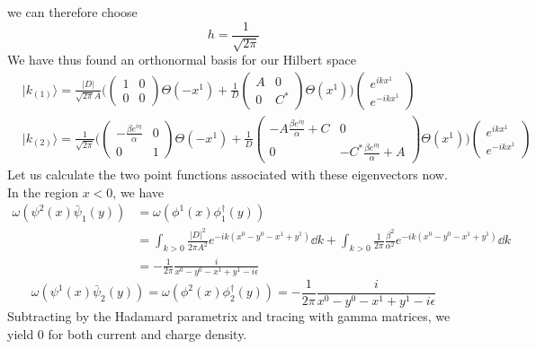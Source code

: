we can therefore choose
\begin{equation*}
h = \frac{1}{\sqrt{2\pi}}
\end{equation*}
We have thus found an orthonormal basis for our Hilbert space
\begin{equation}
\begin{split}
& | k_{(1)} \rangle = \frac{|D|}{\sqrt{2\pi}A}\bigg( \begin{pmatrix} 1 & 0 \\ 0 & 0 \end{pmatrix}
\Theta(-x^1) + 
\frac{1}{D}\begin{pmatrix} A & 0 \\  0 & C^* \end{pmatrix} \Theta(x^1) \bigg)
\begin{pmatrix} e^{ikx^1}  \\ e^{-ikx^1} \end{pmatrix}   \\
& | k_{(2)} \rangle = \frac{1}{\sqrt{2\pi}}
\Bigg( \begin{pmatrix} -\frac{\beta e^{i\eta}}{\alpha} & 0 \\ 0 & 1 \end{pmatrix}
\Theta(-x^1) + 
\frac{1}{D}\begin{pmatrix} -A\frac{\beta e^{i\eta}}{\alpha} + C  & 0\\ 0&  -C^*\frac{\beta e^{i\eta}}{\alpha} + A  \end{pmatrix} \Theta(x^1) \Bigg)
\begin{pmatrix} e^{ikx^1}  \\  e^{-ikx^1}  \end{pmatrix}  
\end{split}
\end{equation}
Let us calculate the two point functions associated with these eigenvectors now. In the region $x<0$, we have
\begin{equation*}
\begin{split}
\omega(\psi^2(x)\bar{\psi}_1(y)) & =  \omega(\phi^1(x)\phi^\dagger_1(y)) \\
& = \int_{k > 0} \frac{|D|^2}{2\pi A^2} e^{-ik(x^0 - y^0 - x^1 + y^1)} \dd k + \int_{k>0} \frac{1}{2\pi}  \frac{\beta^2}{\alpha^2} e^{-ik(x^0 - y^0 - x^1 + y^1)} \dd k\\
& = -\frac{1}{2\pi}\frac{i}{x^0 - y^0 - x^1 + y^1 - i\epsilon} 
\end{split}
\end{equation*}
\begin{equation*}
\omega(\psi^1(x)\bar{\psi}_2(y))   =  \omega(\phi^2(x)\phi^\dagger_2(y)) = -\frac{1}{2\pi}\frac{i}{x^0 - y^0 - x^1 + y^1 - i\epsilon} 
\end{equation*}
Subtracting by the Hadamard parametrix and tracing with gamma matrices, we yield 0 for both current and charge density. 






















